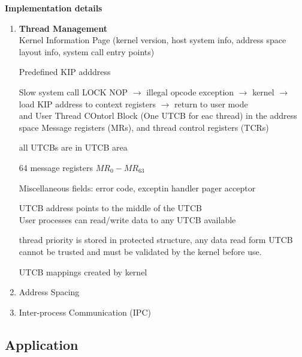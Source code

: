 \documentclass{article}
\begin{document}
    \textbf{Implementation details}
    \begin{enumerate}[1., leftmargin = 0.7cm, nosep]
    \item \textbf{Thread Management}\\
        Kernel Information Page (kernel version, host system info, address space layout
        info, system call entry points)
        
        Predefined KIP adddress

        Slow system call LOCK NOP $\rightarrow$ illegal opcode exception $\rightarrow$ kernel $\rightarrow$ load KIP address
        to context registers $\rightarrow$ return to user mode
        \\ 
        and User Thread COntorl Block (One UTCB for eac thread) in the address space
         Message registers (MRs), and thread control registers (TCRs) 

         all UTCBs are in UTCB area

         64 message registers $MR_0 - MR_63$

         Miscellaneous fields: error code, exceptin handler pager acceptor
         
         UTCB address  points to the middle of the UTCB \\

         User processes can read/write data to any UTCB available

         thread priority is stored in protected structure, any data read form UTCB cannot be
         trusted and must  be validated by the kernel before use.

         UTCB mappings created by kernel

    \item Address Spacing

    \item Inter-process Communication (IPC)



    \end{enumerate}



    \subsection{Application}
    
\end{document}
